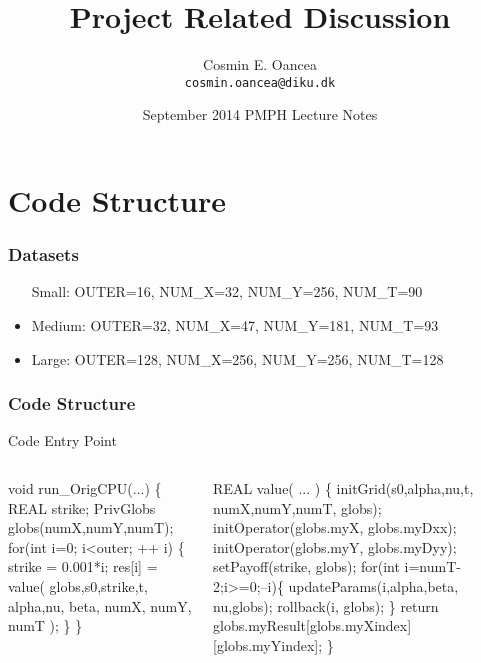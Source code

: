 \documentclass{beamer}
\title[Project]{Project Related Discussion}
\author[C.~Oancea]{Cosmin E. Oancea\\{\tt cosmin.oancea@diku.dk}}
\institute{Department of Computer Science (DIKU)\\University of Copenhagen}
\date[Sept 2014]{September 2014 PMPH Lecture Notes}
\renewcommand{\emph}[1]{\textcolor{structure}{#1}}
\newcommand{\emp}[1]{\textcolor{DikuRed}{ #1}}
\begin{document}
\titleslide


\section{Code Structure}

\begin{frame}[fragile]
	\tableofcontents[currentsection]
\end{frame}


\begin{frame}[fragile,t]
  \frametitle{Datasets} %
\begin{itemize}
    \item[Small:] OUTER=16, NUM\_X=32, NUM\_Y=256, NUM\_T=90
    \item{Medium:} OUTER=32, NUM\_X=47, NUM\_Y=181, NUM\_T=93
    \item{Large:} OUTER=128, NUM\_X=256, NUM\_Y=256, NUM\_T=128
\end{itemize}

\end{frame}


\begin{frame}[fragile,t]
  \frametitle{Code Structure} %

\begin{block}{Code Entry Point}
\begin{columns}
\begin{colorcode}
void   run_OrigCPU(...) \{
  REAL strike;
  PrivGlobs globs(numX,numY,numT);
  \emph{for(int i=0; i<outer; ++ i)} \{
    strike = 0.001*i;
    res[i] = \emp{value}( globs,s0,strike,t,
                    alpha,nu,   beta,
                    numX, numY, numT );
  \}
\}
\end{colorcode}
\begin{colorcode}
REAL   \emp{value}( ... ) \{
  initGrid(s0,alpha,nu,t, 
           numX,numY,numT, 
           globs);
  initOperator(globs.myX,
               globs.myDxx);
  initOperator(globs.myY,
               globs.myDyy);
  setPayoff(strike, globs);
  \alert{for(int i=numT-2;i>=0;--i)}\{
    updateParams(i,alpha,beta,
                 nu,globs);
    rollback(i, globs);
  \}
  return globs.myResult[globs.myXindex]
                       [globs.myYindex];
\}
\end{colorcode}
\end{columns}
\end{block} 

\end{frame}
\end{document}
